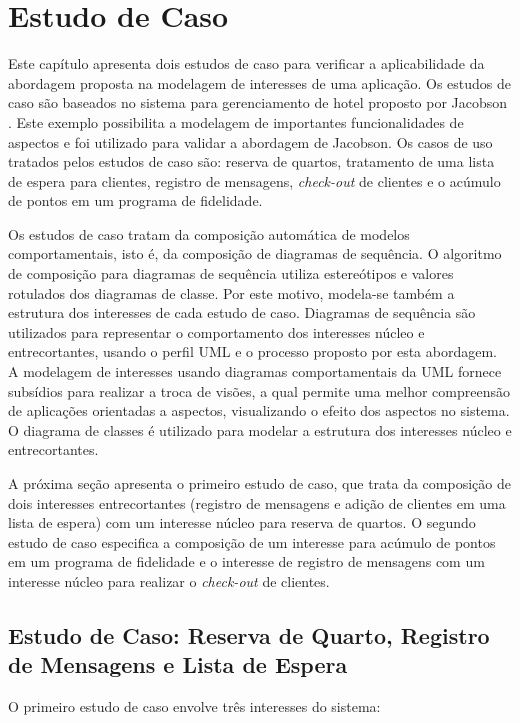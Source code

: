 \chapter{Estudo de Caso}\label{case_study}

Este capítulo apresenta dois estudos de caso para verificar a aplicabilidade da abordagem proposta na modelagem de interesses de uma aplicação. Os
estudos de caso são baseados no sistema para gerenciamento de hotel proposto por Jacobson \cite{Jacobson:2004:ASD:1062430}. Este exemplo possibilita a
modelagem de importantes funcionalidades de aspectos e foi utilizado para validar a abordagem de Jacobson. Os casos de uso tratados pelos
estudos de caso são: reserva de quartos, tratamento de uma lista de espera para clientes, registro de mensagens, \textit{check-out} de clientes e o
acúmulo de pontos em um programa de fidelidade. 

Os estudos de caso tratam da composição automática de modelos comportamentais, isto é, da composição de diagramas de sequência. O algoritmo de
composição para diagramas de sequência utiliza estereótipos e valores rotulados dos diagramas de classe. Por este motivo, modela-se também a
estrutura dos interesses de cada estudo de caso. Diagramas de sequência são utilizados para representar o comportamento dos interesses núcleo e
entrecortantes, usando o perfil UML e o processo proposto por esta abordagem. A modelagem de interesses usando diagramas comportamentais da UML 
fornece subsídios para realizar a troca de visões, a qual permite uma melhor compreensão de aplicações orientadas a aspectos, visualizando o efeito 
dos aspectos no sistema. O diagrama de classes é utilizado para modelar a estrutura dos interesses núcleo e entrecortantes.

A próxima seção apresenta o primeiro estudo de caso, que trata da composição de dois interesses entrecortantes (registro de mensagens e adição de
clientes em uma lista de espera) com um interesse núcleo para reserva de quartos. O segundo estudo de caso especifica a composição de um interesse
para acúmulo de pontos em um programa de fidelidade e o interesse de registro de mensagens com um interesse núcleo para realizar o \textit{check-out}
de clientes.

\section{Estudo de Caso: Reserva de Quarto, Registro de Mensagens e Lista de Espera}

O primeiro estudo de caso envolve três interesses do sistema:

